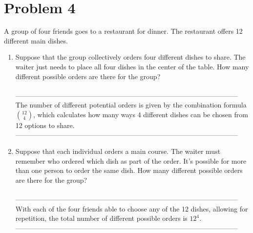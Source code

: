 \documentclass{amsart}
\theoremstyle{definition}
\theoremstyle{Exercise}
\theoremstyle{remark}
\theoremstyle{rule}
\numberwithin{equation}{section}
\begin{document}
\section*{Problem 4}
A group of four friends goes to a restaurant for dinner. The restaurant offers 12 different main dishes.\\
    \begin{enumerate}[label=(\roman*)]
    \item Suppose that the group collectively orders four different dishes to share. The waiter just needs to place all four dishes in the center of the table. How many different possible orders are there for the group?\\\\
--------------------------------------------------------------------------------------------------\\
The number of different potential orders is given by the combination formula \(\binom{12}{4}\), which calculates how many ways 4 different dishes can be chosen from 12 options to share.\\
--------------------------------------------------------------------------------------------------\\
    \item Suppose that each individual orders a main course. The waiter must remember who ordered which dish as part of the order. It's possible for more than one person to order the same dish. How many different possible orders are there for the group?\\\\
--------------------------------------------------------------------------------------------------\\
With each of the four friends able to choose any of the 12 dishes, allowing for repetition, the total number of different possible orders is \(12^4\).\\
--------------------------------------------------------------------------------------------------\\
    \end{enumerate}
\end{document}
